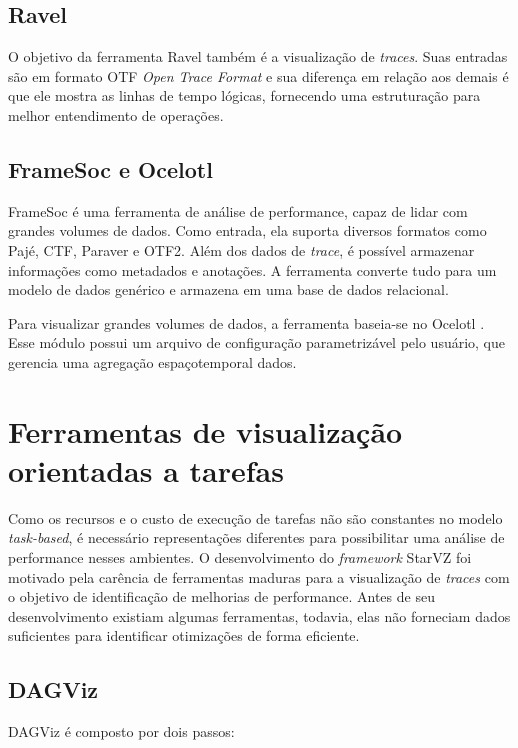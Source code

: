\documentclass[ppgc,espec]{iiufrgs}
\begin{document}
\subsection{Ravel}
O objetivo da ferramenta Ravel \cite{ref:ravel} também é a visualização de \emph{traces}. Suas entradas são em formato OTF \emph{Open Trace Format} e sua diferença em relação aos demais é que ele mostra as linhas de tempo lógicas, fornecendo uma estruturação para melhor entendimento de operações.

\subsection{FrameSoc e Ocelotl}

FrameSoc \cite{ref:framesoc} é uma ferramenta de análise de performance, capaz de lidar com grandes volumes de dados. Como entrada, ela suporta diversos
formatos como Pajé, CTF, Paraver e OTF2. Além dos dados de \emph{trace}, é possível armazenar informações como metadados e anotações. A ferramenta converte tudo para um modelo de dados genérico e armazena em uma base de dados relacional.

Para visualizar grandes volumes de dados, a ferramenta baseia-se no Ocelotl \cite{ref:ocelotl}. Esse módulo possui um arquivo de configuração parametrizável pelo usuário, que gerencia uma agregação espaçotemporal dados.

\section{Ferramentas de visualização orientadas a tarefas}

Como os recursos e o custo de execução de tarefas não são constantes no modelo \emph{task-based}, é necessário representações diferentes para
possibilitar uma análise de performance nesses ambientes. O desenvolvimento do \emph{framework} StarVZ \cite{ref:starvz} foi motivado pela carência
de ferramentas maduras para a visualização de \emph{traces} com o objetivo de identificação de melhorias de performance. Antes de seu desenvolvimento existiam algumas ferramentas, todavia, elas não forneciam dados suficientes para identificar otimizações de forma eficiente.

\subsection{DAGViz}

DAGViz \cite{ref:dagviz} é composto por dois passos: 
\end{document}
